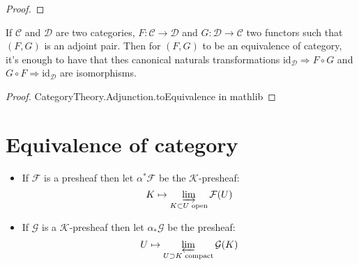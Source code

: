 \begin{proof}



\end{proof}

\begin{lemma}\label{lem:equiv_of_adj}
    If $\mathcal{C}$ and $\mathcal{D}$ are two categories, $F:\mathcal{C}\to \mathcal{D}$ and $G:\mathcal{D}\to \mathcal{C}$ two functors such that $(F,G)$ is an adjoint pair. Then for $(F,G)$ to be an equivalence of category, it's enough to have that thes canonical naturals transformations $\text{id}_{\mathcal{D}}\Rightarrow F\circ G$ and $G\circ F\Rightarrow \text{id}_{\mathcal{D}}$ are isomorphisms.
\end{lemma}

\begin{proof}
    CategoryTheory.Adjunction.toEquivalence in mathlib
\end{proof}


\section{Equivalence of category}

\begin{definition}\label{def:adj_kprshv_and_prshv}
    \begin{itemize}
        \item If $\mathcal{F}$ is a presheaf then let $\alpha^*\mathcal{F}$ be the $\mathcal{K}$-presheaf:\[K\mapsto \varinjlim\limits_{K\subset U \text{ open}}\mathcal{F}(U)\]
        \item If $\mathcal{G}$ is a $\mathcal{K}$-presheaf then let $\alpha_*\mathcal{G}$ be the presheaf:\[ U\mapsto \varprojlim\limits_{U\supset K \text{ compact}}\mathcal{G}(K)\]
    \end{itemize}
\end{definition}

